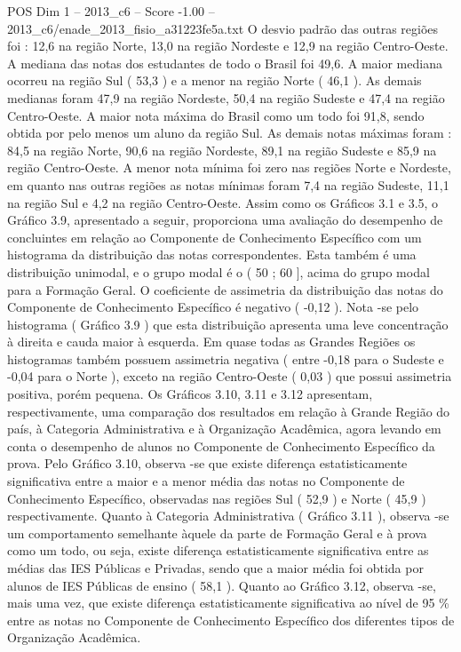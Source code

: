 \begin{textsample}{POS Dim 1 – 2013\_c6 – Score -1.00 – 2013\_c6/enade\_2013\_fisio\_a31223fe5a.txt}
O desvio padrão das outras regiões foi : 12,6 na região Norte, 13,0 na região Nordeste e 12,9 na região Centro-Oeste.
A mediana das notas dos estudantes de todo o Brasil foi 49,6.
A maior mediana ocorreu na região Sul ( 53,3 ) e a menor na região Norte ( 46,1 ).
As demais medianas foram 47,9 na região Nordeste, 50,4 na região Sudeste e 47,4 na região Centro-Oeste.
A maior nota máxima do Brasil como um todo foi 91,8, sendo obtida por pelo menos um aluno da região Sul.
As demais notas máximas foram : 84,5 na região Norte, 90,6 na região Nordeste, 89,1 na região Sudeste e 85,9 na região Centro-Oeste.
A menor nota mínima foi zero nas regiões Norte e Nordeste, em quanto nas outras regiões as notas mínimas foram 7,4 na região Sudeste, 11,1 na região Sul e 4,2 na região Centro-Oeste.
Assim como os Gráficos 3.1 e 3.5, o Gráfico 3.9, apresentado a seguir, proporciona uma avaliação do desempenho de concluintes em relação ao Componente de Conhecimento Específico com um histograma da distribuição das notas correspondentes.
Esta também é uma distribuição unimodal, e o grupo modal é o ( 50 ; 60 ], acima do grupo modal para a Formação Geral.
O coeficiente de assimetria da distribuição das notas do Componente de Conhecimento Específico é negativo ( -0,12 ).
Nota -se pelo histograma ( Gráfico 3.9 ) que esta distribuição apresenta uma leve concentração à direita e cauda maior à esquerda.
Em quase todas as Grandes Regiões os histogramas também possuem assimetria negativa ( entre -0,18 para o Sudeste e -0,04 para o Norte ), exceto na região Centro-Oeste ( 0,03 ) que possui assimetria positiva, porém pequena.
Os Gráficos 3.10, 3.11 e 3.12 apresentam, respectivamente, uma comparação dos resultados em relação à Grande Região do país, à Categoria Administrativa e à Organização Acadêmica, agora levando em conta o desempenho de alunos no Componente de Conhecimento Específico da prova.
Pelo Gráfico 3.10, observa -se que existe diferença estatisticamente significativa entre a maior e a menor média das notas no Componente de Conhecimento Específico, observadas nas regiões Sul ( 52,9 ) e Norte ( 45,9 ) respectivamente.
Quanto à Categoria Administrativa ( Gráfico 3.11 ), observa -se um comportamento semelhante àquele da parte de Formação Geral e à prova como um todo, ou seja, existe diferença estatisticamente significativa entre as médias das IES Públicas e Privadas, sendo que a maior média foi obtida por alunos de IES Públicas de ensino ( 58,1 ).
Quanto ao Gráfico 3.12, observa -se, mais uma vez, que existe diferença estatisticamente significativa ao nível de 95 \% entre as notas no Componente de Conhecimento Específico dos diferentes tipos de Organização Acadêmica.

\end{textsample}
